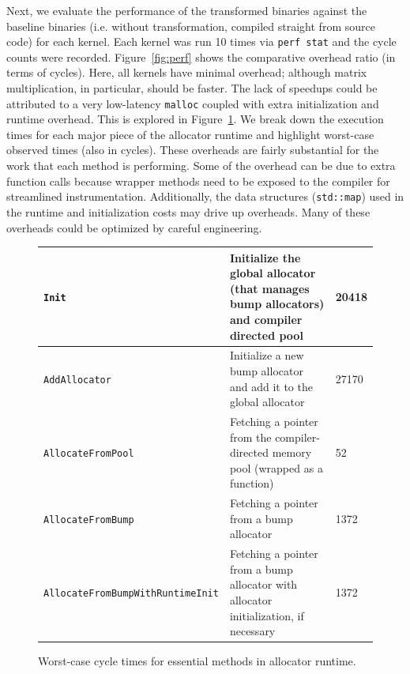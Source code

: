 \documentclass{article}
\begin{document}
Next, we evaluate the performance of the transformed binaries against the baseline binaries (i.e.
without transformation, compiled straight from source code) for each kernel. Each kernel was 
run 10 times via \texttt{perf stat} and the cycle counts were recorded. Figure~\ref{fig:perf} shows the 
comparative overhead ratio (in terms of cycles). Here, all kernels have minimal overhead; although
matrix multiplication, in particular, should be faster. The lack of speedups could be attributed
to a very low-latency \texttt{malloc} coupled with extra initialization and runtime overhead. This
is explored in Figure~\ref{fig:cycles}. We break down the execution times for each major piece of the 
allocator runtime and highlight worst-case observed times (also in cycles). These overheads are
fairly substantial for the work that each method is performing. Some of the overhead can be due
to extra function calls because wrapper methods need to be exposed to the compiler for streamlined
instrumentation. Additionally, the data structures (\texttt{std::map}) used in the runtime and 
initialization costs may drive up overheads. Many of these overheads could be optimized by 
careful engineering.

\begin{figure} [htp]
        \small
        \centering
        \begin{tabular}{ | m{5cm} | m{9cm} | m{1cm} | } 
          \hline
            \texttt{Init} & Initialize the global allocator (that manages bump allocators) and compiler directed pool & 20418 \\ 
          \hline
            \texttt{AddAllocator} & Initialize a new bump allocator and add it to the global allocator & 27170 \\ 
          \hline
            \texttt{AllocateFromPool} & Fetching a pointer from the compiler-directed memory pool (wrapped as a function) & 52 \\ 
          \hline
            \texttt{AllocateFromBump} & Fetching a pointer from a bump allocator & 1372 \\ 
          \hline
            \texttt{AllocateFromBumpWithRuntimeInit} & Fetching a pointer from a bump allocator with allocator initialization, if necessary & 1372 \\ 
          \hline
        \end{tabular}
        \caption{Worst-case cycle times for essential methods in allocator runtime.}
        \label{fig:cycles}
\end{figure}
\end{document}
